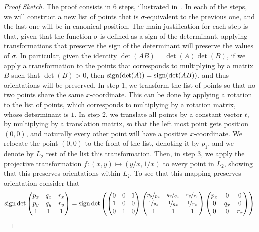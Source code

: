 
\begin{proof}[Proof Sketch]
The proof consists in 6 steps, illustrated in~. In each of the steps, we will construct a new list of points that is $\sigma$-equivalent to the previous one, and the last one will be in canonical position.
The main justification for each step is that, given that the function $\sigma$ is defined as a sign of the determinant, applying transformations that preserve the sign of the determinant will preserve the values of $\sigma$. In particular, given the identity $\det(AB) = \det(A)\det(B)$, if we apply a transformation to the points that corresponds to multiplying by a matrix $B$ such that $\det(B) > 0$, then $\operatorname{sign}(\det(A)) = \operatorname{sign}(\det(AB))$, and thus orientations will be preserved.
In step 1, we transform the list of points so that no two points share the same $x$-coordinate. This can be done by applying a rotation to the list of points, which corresponds to multiplying by a rotation matrix, whose determinant is $1$. 
In step 2, we translate all points by a constant vector $t$, by multiplying by a translation matrix, so that the left most point gets position $(0, 0)$, and naturally every other point will have a positive $x$-coordinate. We relocate the point $(0,0)$ to the front of the list, denoting it by $p_1$, and we denote by $L_2$ rest of the list this transformation.
Then, in step 3, we  apply the projective transformation $f: (x, y) \mapsto (y/x, 1/x)$ to every point in $L_2$, showing that this preserves orientations within $L_2$.
To see that this mapping preserves orientation consider that 
\begin{align*}
 \sign \det \begin{pmatrix} p_x & q_x & r_x \\ p_y & q_y & r_y \\ 1 & 1 & 1 \end{pmatrix} &=  \sign \det \left( \begin{pmatrix} 0 & 0 & 1 \\ 1 & 0 & 0\\ 0 & 1 & 0 \end{pmatrix}  \begin{pmatrix} \nicefrac{p_y}{p_x} & \nicefrac{q_y}{q_x} & \nicefrac{r_y}{r_x} \\ \nicefrac{1}{p_x} & \nicefrac{1}{q_x} & \nicefrac{1}{r_x} \\ 1 & 1 & 1 \end{pmatrix}  \begin{pmatrix} p_x & 0 & 0 \\ 0 & q_x & 0\\ 0 & 0 & r_x \end{pmatrix} \right)\\

\end{align*}
\end{proof}
